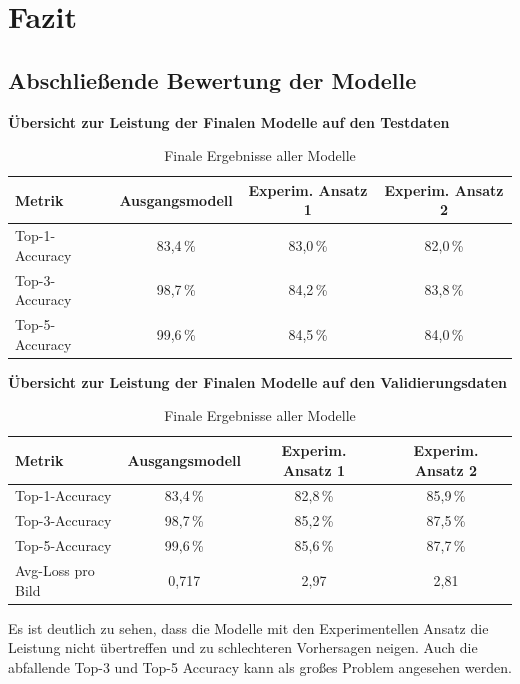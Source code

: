 \documentclass[12pt,oneside]{article}
\begin{document}
  
  
  \section{Fazit}
  
  \subsection{Abschließende Bewertung der Modelle}
  \textbf{Übersicht zur Leistung der Finalen Modelle auf den Testdaten}
    \begin{table}[h!]
  	\centering
  	\begin{tabular}{|l|c|c|c|}
  		\hline
  		\rowcolor{lightgray} \textbf{Metrik} & \textbf{Ausgangsmodell} & \textbf{Experim. Ansatz 1} &\textbf{Experim. Ansatz 2} \\ \hline
  		Top-1-Accuracy & 83,4\,\%  & 83,0\,\% & 82,0\,\% \\ \hline
  		Top-3-Accuracy & 98,7\,\%  & 84,2\,\% & 83,8\,\% \\ \hline
  		Top-5-Accuracy & 99,6\,\%  & 84,5\,\% & 84,0\,\% \\ \hline
  	\end{tabular}
  	\caption{Finale Ergebnisse aller Modelle}
  \end{table}
  
  \textbf{Übersicht zur Leistung der Finalen Modelle auf den Validierungsdaten}
      \begin{table}[h!]
  	\centering
  	\begin{tabular}{|l|c|c|c|}
  		\hline
  		\rowcolor{lightgray} \textbf{Metrik} & \textbf{Ausgangsmodell} & \textbf{Experim. Ansatz 1} &\textbf{Experim. Ansatz 2} \\ \hline
  		Top-1-Accuracy & 83,4\,\% & 82,8\,\% & 85,9\,\% \\ \hline
  		Top-3-Accuracy & 98,7\,\%  & 85,2\,\% & 87,5\,\% \\ \hline
  		Top-5-Accuracy & 99,6\,\%  & 85,6\,\% & 87,7\,\%  \\ \hline
  		Avg-Loss pro Bild & 0,717 & 2,97 & 2,81 \\ \hline
  	\end{tabular}
  	\caption{Finale Ergebnisse aller Modelle}
  \end{table}
  
  
	Es ist deutlich zu sehen, dass die Modelle mit den Experimentellen Ansatz die Leistung nicht übertreffen und zu schlechteren Vorhersagen neigen. Auch die abfallende Top-3 und Top-5 Accuracy kann als großes Problem angesehen werden.
	
\end{document}
